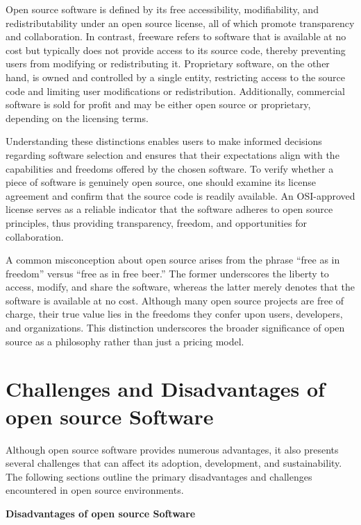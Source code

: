 Open source software is defined by its free accessibility, modifiability, and redistributability under an open source license, 
all of which promote transparency and collaboration. In contrast, freeware refers to software that is available at no cost but typically does not provide access to 
its source code, thereby preventing users from modifying or redistributing it. Proprietary software, 
on the other hand, is owned and controlled by a single entity, restricting access to the source code and limiting user modifications or redistribution. 
Additionally, commercial software is sold for profit and may be either open source or proprietary, depending on the licensing terms.

Understanding these distinctions enables users to make informed decisions regarding software selection and ensures that their expectations align with the capabilities and 
freedoms offered by the chosen software. To verify whether a piece of software is genuinely open source, one should examine its license agreement and confirm that the source 
code is readily available. An OSI-approved license serves as a reliable indicator that the software adheres to open source principles, 
thus providing transparency, freedom, and opportunities for collaboration.

A common misconception about open source arises from the phrase “free as in freedom” versus “free as in free beer.” The former underscores the liberty to access, modify, 
and share the software, whereas the latter merely denotes that the software is available at no cost. Although many open source projects are free of charge, 
their true value lies in the freedoms they confer upon users, developers, and organizations. This distinction underscores the broader significance of open source as a 
philosophy rather than just a pricing model.

\cite{forbes_misconceptions_open_source_2024}

\section{Challenges and Disadvantages of open source Software}

Although open source software provides numerous advantages, it also presents several challenges that can affect its adoption, development, and sustainability. The following sections outline the primary disadvantages and challenges encountered in open source environments.

\textbf{Disadvantages of open source Software}

